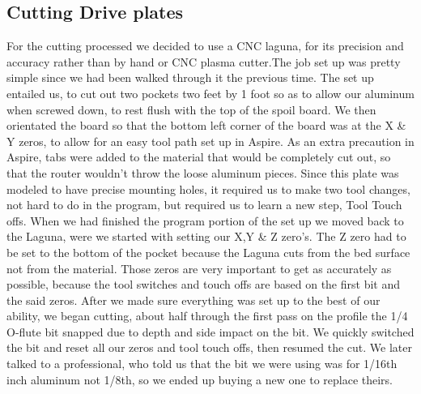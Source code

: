 \documentclass{article}
\begin{document}
\subsection{Cutting Drive plates}
For the cutting processed we decided to use a CNC laguna, for its precision and accuracy rather than by hand or CNC plasma cutter.The job set up was pretty simple since we had been walked through it the previous time. The set up entailed us, to cut out two pockets two feet by 1 foot so as to allow our aluminum when screwed down, to rest flush with the top of the spoil board. We then orientated the board so that the bottom left corner of the board was at the X \& Y zeros, to allow for an easy tool path set up in Aspire. As an extra precaution in Aspire, tabs were added to the material that would be completely cut out, so that the router wouldn't throw the loose aluminum pieces. Since this plate was modeled to have precise mounting holes, it required us to make two tool changes, not hard to do in the program, but required us to learn a new step, Tool Touch offs. When we had finished the program portion of the set up we moved back to the Laguna, were we started with setting our X,Y \& Z zero's. The Z zero had to be set to the bottom of the pocket because the Laguna cuts from the bed surface not from the material. Those zeros are very important to get as accurately as possible, because the tool switches and touch offs are based on the first bit and the said zeros. After we made sure everything was set up to the best of our ability, we began cutting, about half through the first pass on the profile the 1/4 O-flute bit snapped due to depth and side impact on the bit. We quickly switched the bit and reset all our zeros and tool touch offs, then resumed the cut. We later talked to a professional, who told us that the bit we were using was for 1/16th inch aluminum not 1/8th, so we ended up buying a new one to replace theirs.  
\end{document}
